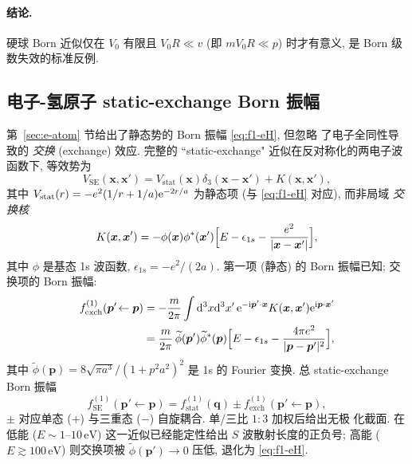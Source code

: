 \paragraph{结论.} 硬球 Born 近似仅在 $V_{0}$ 有限且 $V_{0}R\ll v$ (即
$mV_{0}R\ll p$) 时才有意义, 是 Born 级数失效的标准反例.

\subsection{电子-氢原子 static-exchange Born 振幅}

第~\ref{sec:e-atom} 节给出了静态势的 Born 振幅 \eqref{eq:f1-eH}, 但忽略
了电子全同性导致的 \emph{交换} (exchange) 效应. 完整的 ``static-exchange"
近似在反对称化的两电子波函数下, 等效势为
\begin{equation}
V_{\text{SE}}(\bm x,\bm x')=V_{\text{stat}}(\bm x)\delta_{3}(\bm x-\bm x')
+K(\bm x,\bm x'),
\label{eq:born-ex-eH-VSE}
\end{equation}
其中 $V_{\text{stat}}(r)=-e^{2}(1/r+1/a)\mathrm{e}^{-2r/a}$ 为静态项 (与 \eqref{eq:f1-eH}
对应), 而非局域 \emph{交换核}
\begin{equation}
K(\bm x,\bm x')=-\phi(\bm x)\phi^{*}(\bm x')\Bigl[E-\epsilon_{1s}-\frac{e^{2}}{|\bm x-\bm x'|}\Bigr],
\label{eq:born-ex-eH-K}
\end{equation}
其中 $\phi$ 是基态 1s 波函数, $\epsilon_{1s}=-e^{2}/(2a)$. 第一项 (静态)
的 Born 振幅已知; 交换项的 Born 振幅:
\begin{align}
f^{(1)}_{\text{exch}}(\bm p'\!\leftarrow\bm p)
&=-\frac{m}{2\pi}\int\mathrm{d}^{3}x\mathrm{d}^{3}x'\,
\mathrm{e}^{-\mathrm{i}\bm p'\cdot\bm x}K(\bm x,\bm x')\mathrm{e}^{\mathrm{i}\bm p\cdot\bm x'}\notag\\
&=\frac{m}{2\pi}\,\widetilde\phi(\bm p')\widetilde\phi^{*}(\bm p)
\Bigl[E-\epsilon_{1s}-\frac{4\pi e^{2}}{|\bm p-\bm p'|^{2}}\Bigr],
\label{eq:born-ex-eH-fexch}
\end{align}
其中 $\widetilde\phi(\bm p)=8\sqrt{\pi a^{3}}/(1+p^{2}a^{2})^{2}$ 是 1s 的
Fourier 变换. 总 static-exchange Born 振幅
\begin{equation}
f^{(1)}_{\text{SE}}(\bm p'\!\leftarrow\bm p)=f^{(1)}_{\text{stat}}(\bm q)\pm f^{(1)}_{\text{exch}}(\bm p'\!\leftarrow\bm p),
\label{eq:born-ex-eH-fSE}
\end{equation}
$\pm$ 对应单态 (+) 与三重态 (−) 自旋耦合. 单/三比 $1:3$ 加权后给出无极
化截面. 在低能 ($E\sim 1$--$10\,\mathrm{eV}$) 这一近似已经能定性给出 $S$
波散射长度的正负号; 高能 ($E\gtrsim 100\,\mathrm{eV}$) 则交换项被
$\widetilde\phi(\bm p')\to 0$ 压低, 退化为 \eqref{eq:f1-eH}.

